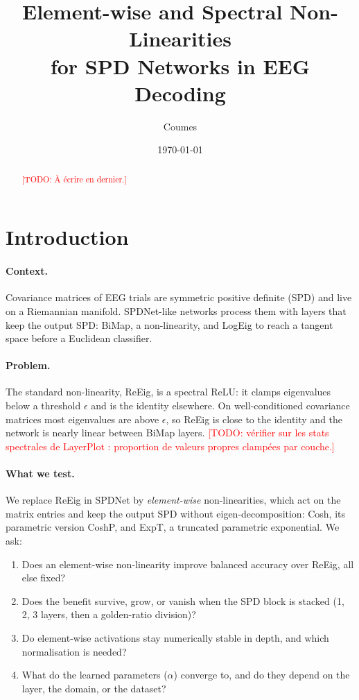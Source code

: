 \documentclass[11pt,a4paper]{article}
\title{Element-wise and Spectral Non-Linearities\\for SPD Networks in EEG Decoding}
\author{Coumes}
\date{\today}
\newcommand{\todo}[1]{\textcolor{red}{[TODO: #1]}}
\begin{document}
\maketitle

\begin{abstract}
\todo{À écrire en dernier.}
\end{abstract}

\section{Introduction}

\paragraph{Context.}
Covariance matrices of EEG trials are symmetric positive definite (SPD) and live on a
Riemannian manifold. SPDNet-like networks process them with layers that keep the output
SPD: BiMap, a non-linearity, and LogEig to reach a tangent space
before a Euclidean classifier.

\paragraph{Problem.}
The standard non-linearity, ReEig, is a spectral ReLU: it clamps eigenvalues below a
threshold $\epsilon$ and is the identity elsewhere. On well-conditioned covariance matrices
most eigenvalues are above $\epsilon$, so ReEig is close to the identity and the network is
nearly linear between BiMap layers. \todo{vérifier sur les stats spectrales de LayerPlot :
proportion de valeurs propres clampées par couche.}

\paragraph{What we test.}
We replace ReEig in SPDNet by \emph{element-wise} non-linearities, which act on the matrix
entries and keep the output SPD without eigen-decomposition: Cosh, its parametric version
CoshP, and ExpT, a truncated parametric exponential. We ask:
\begin{enumerate}
  \item[Q1] Does an element-wise non-linearity improve balanced accuracy over ReEig, all else fixed?
  \item[Q2] Does the benefit survive, grow, or vanish when the SPD block is stacked
            (1, 2, 3 layers, then a golden-ratio division)?
  \item[Q3] Do element-wise activations stay numerically stable in depth, and which
            normalisation is needed?
  \item[Q4] What do the learned parameters ($\alpha$) converge to, and do they depend on
            the layer, the domain, or the dataset?
\end{enumerate}
\end{document}
